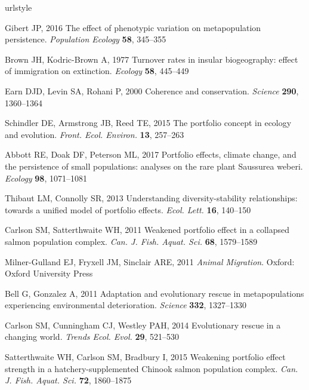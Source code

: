 \documentclass{revtex4}
\begin{document}
\begin{thebibliography}{10}
\expandafter\ifx\csname urlstyle\endcsname\relax
  \providecommand{\doi}[1]{doi:\discretionary{}{}{}#1}\else
  \providecommand{\doi}{doi:\discretionary{}{}{}\begingroup
  \urlstyle{rm}\Url}\fi

Gibert JP, 2016 {The effect of phenotypic variation on metapopulation
  persistence}.
\newblock \emph{Population Ecology} \textbf{58}, 345--355

Brown JH, Kodric-Brown A, 1977 {Turnover rates in insular biogeography: effect
  of immigration on extinction}.
\newblock \emph{Ecology} \textbf{58}, 445--449

Earn DJD, Levin SA, Rohani P, 2000 {Coherence and conservation}.
\newblock \emph{Science} \textbf{290}, 1360--1364

Schindler DE, Armstrong JB, Reed TE, 2015 {The portfolio concept in ecology and
  evolution}.
\newblock \emph{Front. Ecol. Environ.} \textbf{13}, 257--263

Abbott RE, Doak DF, Peterson ML, 2017 {Portfolio effects, climate change, and
  the persistence of small populations: analyses on the rare plant Saussurea
  weberi.}
\newblock \emph{Ecology} \textbf{98}, 1071--1081

Thibaut LM, Connolly SR, 2013 {Understanding diversity-stability relationships:
  towards a unified model of portfolio effects.}
\newblock \emph{Ecol. Lett.} \textbf{16}, 140--150

Carlson SM, Satterthwaite WH, 2011 {Weakened portfolio effect in a collapsed
  salmon population complex}.
\newblock \emph{Can. J. Fish. Aquat. Sci.} \textbf{68}, 1579--1589

Milner-Gulland EJ, Fryxell JM, Sinclair ARE, 2011 \emph{{Animal Migration}}.
\newblock Oxford: Oxford University Press

Bell G, Gonzalez A, 2011 {Adaptation and evolutionary rescue in metapopulations
  experiencing environmental deterioration}.
\newblock \emph{Science} \textbf{332}, 1327--1330

Carlson SM, Cunningham CJ, Westley PAH, 2014 {Evolutionary rescue in a changing
  world}.
\newblock \emph{Trends Ecol. Evol.} \textbf{29}, 521--530

Satterthwaite WH, Carlson SM, Bradbury I, 2015 {Weakening portfolio effect
  strength in a hatchery-supplemented Chinook salmon population complex}.
\newblock \emph{Can. J. Fish. Aquat. Sci.} \textbf{72}, 1860--1875


\end{thebibliography}
\end{document}
